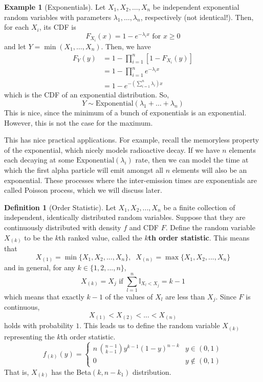 \documentclass{article}
\theoremstyle{definition}
\newtheorem{example}{Example}[section]
\theoremstyle{remark}
\theoremstyle{definition}
\newtheorem{definition}{Definition}[section]
\begin{document}
\begin{example}[Exponentials]
Let $X_1, X_2, \ldots, X_n$ be independent exponential random variables with parameters $\lambda_1, \ldots, \lambda_n$, respectively (not identical!). Then, for each $X_i$, its CDF is 
\[F_{X_i} (x) = 1 - e^{-\lambda_i x} \text{ for } x \geq 0\]
and let $Y = \min(X_1, \ldots, X_n)$. Then, we have 
\begin{align*}
    F_Y (y) & = 1 - \prod_{i=1}^n [ 1 - F_{X_i} (y)] \\
    & = 1 - \prod_{i=1}^n e^{-\lambda_i x} \\
    & = 1 - e^{- ( \sum_{i=1}^n \lambda_i ) x}
\end{align*}
which is the CDF of an exponential distribution. So, 
\[Y \sim \mathrm{Exponential}(\lambda_1 + \ldots + \lambda_n)\]
This is nice, since the minimum of a bunch of exponentials is an exponential. However, this is not the case for the maximum. 
\end{example}

This has nice practical applications. For example, recall the memoryless property of the exponential, which nicely models radioactive decay. If we have $n$ elements each decaying at some $\mathrm{Exponential}(\lambda_i)$ rate, then we can model the time at which the first alpha particle will emit amongst all $n$ elements will also be an exponential. These processes where the inter-emission times are exponentials are called Poisson process, which we will discuss later. 


\begin{definition}[Order Statistic]
Let $X_1, X_2, ..., X_n$ be a finite collection of independent, identically distributed random variables. Suppose that they are continuously distributed with density $f$ and CDF $F$. Define the random variable $X_{(k)}$ to be the $k$th ranked value, called the \textbf{$k$th order statistic}. This means that 
\[X_{(1)} = \min\{X_1, X_2, ..., X_n\}, \;\; X_{(n)} = \max\{X_1, X_2, ..., X_n\}\]
and in general, for any $k \in \{1, 2, ..., n\}$, 
\[X_{(k)} = X_j \text{ if } \sum_{l=1}^n \mathbb{I}_{X_l < X_j} = k - 1\]
which means that exactly $k-1$ of the values of $X_l$ are less than $X_j$. Since $F$ is continuous, 
\[X_{(1)} < X_{(2)} < ... < X_{(n)}\]
holds with probability $1$. This leads us to define the random variable $X_{(k)}$ representing the $k$th order statistic.
\[f_{(k)} (y) = \begin{cases} 
n \, \binom{n-1}{k-1} y^{k-1} (1-y)^{n-k} & y \in (0, 1) \\
0 & y \not\in (0,1)
\end{cases}\]
That is, $X_{(k)}$ has the Beta$(k, n-k_1)$ distribution. 
\end{definition}
\end{document}
